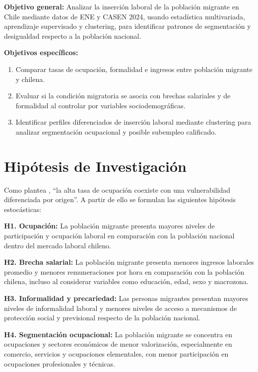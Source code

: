 \textbf{Objetivo general:} Analizar la inserción laboral de la población migrante en Chile mediante datos de ENE y CASEN 2024, usando estadística multivariada, aprendizaje supervisado y clustering, para identificar patrones de segmentación y desigualdad respecto a la población nacional.

\textbf{Objetivos específicos:}
\begin{enumerate}
    \item Comparar tasas de ocupación, formalidad e ingresos entre población migrante y chilena.
    \item Evaluar si la condición migratoria se asocia con brechas salariales y de formalidad al controlar por variables sociodemográficas.
    \item Identificar perfiles diferenciados de inserción laboral mediante clustering para analizar segmentación ocupacional y posible subempleo calificado.
\end{enumerate}

\section{Hipótesis de Investigación}

Como plantea \citet[p.22]{correa2025migracionchile}, ``la alta tasa de ocupación coexiste con una vulnerabilidad diferenciada por origen''. A partir de ello se formulan las siguientes hipótesis estocásticas:

\textbf{H1. Ocupación:} La población migrante presenta mayores niveles de participación y ocupación laboral en comparación con la población nacional dentro del mercado laboral chileno.

\textbf{H2. Brecha salarial:} La población migrante presenta menores ingresos laborales promedio y menores remuneraciones por hora en comparación con la población chilena, incluso al considerar variables como educación, edad, sexo y macrozona.

\textbf{H3. Informalidad y precariedad:} Las personas migrantes presentan mayores niveles de informalidad laboral y menores niveles de acceso a mecanismos de protección social y previsional respecto de la población nacional.

\textbf{H4. Segmentación ocupacional:} La población migrante se concentra en ocupaciones y sectores económicos de menor valorización, especialmente en comercio, servicios y ocupaciones elementales, con menor participación en ocupaciones profesionales y técnicas.

